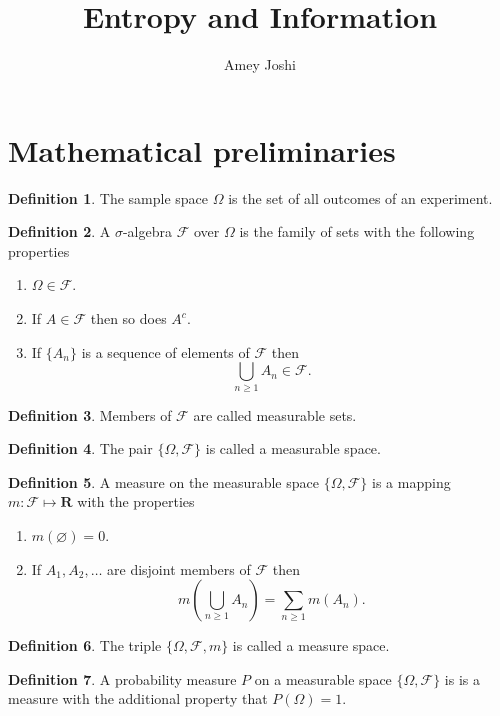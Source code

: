 \documentclass{article}
\title{Entropy and Information}
\author{Amey Joshi}
\numberwithin{equation}{section}
\theoremstyle{plain}
\numberwithin{thm}{section}
\theoremstyle{plain}
\numberwithin{prop}{section}
\theoremstyle{definition}
\newtheorem{defn}{Definition}
\numberwithin{defn}{section}
\theoremstyle{remark}
\begin{document}
\maketitle
{}
\section{Mathematical preliminaries}\label{s1}
\begin{defn}\label{s1d1}
The sample space $\Omega$ is the set of all outcomes of an experiment. 
\end{defn}
\begin{defn}\label{s1d2}
A $\sigma$-algebra $\mathcal{F}$ over $\Omega$ is the family of sets with the 
following properties
\begin{enumerate}
\item $\Omega \in \mathcal{F}$.
\item If $A \in \mathcal{F}$ then so does $A^c$.
\item If $\{A_n\}$ is a sequence of elements of $\mathcal{F}$ then
\[
\bigcup_{n \ge 1} A_n \in \mathcal{F}.
\]
\end{enumerate}
\end{defn}
\begin{defn}\label{s1d3}
Members of $\mathcal{F}$ are called measurable sets.
\end{defn}
\begin{defn}\label{s1d4}
The pair $\{\Omega, \mathcal{F}\}$ is called a measurable space.
\end{defn}
\begin{defn}\label{s1d5}
A measure on the measurable space $\{\Omega, \mathcal{F}\}$ is a mapping
$m: \mathcal{F} \mapsto \mathbf{R}$ with the properties
\begin{enumerate}
\item $m(\varnothing) = 0$.
\item If $A_1, A_2, \ldots$ are disjoint members of $\mathcal{F}$ then
\[
m\left(\bigcup_{n \ge 1} A_n \right) = \sum_{n \ge 1}m(A_n).
\]
\end{enumerate}
\end{defn}
\begin{defn}\label{s1d6}
The triple $\{\Omega, \mathcal{F}, m\}$ is called a measure space.
\end{defn}
\begin{defn}\label{s1d7}
A probability measure $P$ on a measurable space $\{\Omega, \mathcal{F}\}$ is
is a measure with the additional property that $P(\Omega) = 1$.
\end{defn}
\end{document}
